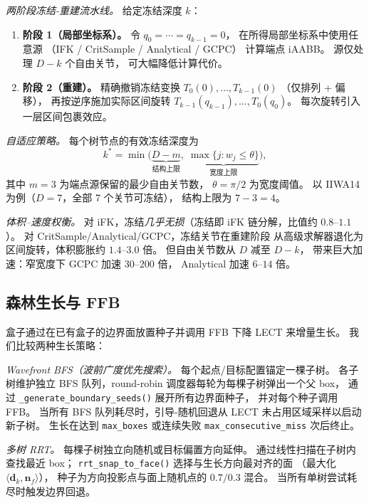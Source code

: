 \documentclass[journal]{IEEEtran}
\begin{document}
\emph{两阶段冻结-重建流水线。}
给定冻结深度 $k$：
\begin{enumerate}
  \item \textbf{阶段 1（局部坐标系）。}
    令 $q_0{=}{\cdots}{=}q_{k-1}{=}0$，
    在所得局部坐标系中使用任意源
    （IFK / CritSample / Analytical / GCPC）
    计算端点 iAABB。
    源仅处理 $D{-}k$ 个自由关节，
    可大幅降低计算代价。
  \item \textbf{阶段 2（重建）。}
    精确撤销冻结变换 $T_0(0),\ldots,T_{k-1}(0)$
    （仅排列 + 偏移），
    再按逆序施加实际区间旋转
    $T_{k-1}(q_{k-1}),\ldots,T_0(q_0)$。
    每次旋转引入一层区间包裹效应。
\end{enumerate}

\emph{自适应策略。}
每个树节点的有效冻结深度为
\begin{equation}\label{eq:freeze_depth}
  k^* = \min\!\bigl(
    \underbrace{D - m}_{\text{结构上限}},\;
    \underbrace{\max\{j : w_j \leq \theta\}}_{\text{宽度上限}}
  \bigr),
\end{equation}
其中 $m{=}3$ 为端点源保留的最少自由关节数，
$\theta{=}\pi/2$ 为宽度阈值。
以 IIWA14 为例（$D{=}7$，全部 7 个关节可冻结），
结构上限为 $7{-}3{=}4$。

\emph{体积--速度权衡。}
对 iFK，冻结\emph{几乎无损}（冻结即 iFK 链分解，比值约 $0.8$--$1.1$）。
对 CritSample/Analytical/GCPC，冻结关节在重建阶段
从高级求解器退化为区间旋转，体积膨胀约 $1.4$--$3.0$ 倍。
但自由关节数从 $D$ 减至 $D{-}k$，
带来巨大加速：窄宽度下 GCPC 加速 $30$--$200$ 倍，
Analytical 加速 $6$--$14$ 倍。

\subsection{森林生长与 FFB}\label{sec:forest_growth}

盒子通过在已有盒子的边界面放置种子并调用 FFB 下降 LECT 来增量生长。
我们比较两种生长策略：

\emph{Wavefront BFS（波前广度优先搜索）。}
每个起点/目标配置锚定一棵子树。
各子树维护独立 BFS 队列，round-robin 调度器每轮为每棵子树弹出一个父 box，
通过 \texttt{\_generate\_boundary\_seeds()} 展开所有边界面种子，
并对每个种子调用 FFB。
当所有 BFS 队列耗尽时，引导-随机回退从 LECT 未占用区域采样以启动新子树。
生长在达到 \texttt{max\_boxes} 或连续失败 \texttt{max\_consecutive\_miss}
次后终止。

\emph{多树 RRT。}
每棵子树独立向随机或目标偏置方向延伸。
通过线性扫描在子树内查找最近 box；
\texttt{rrt\_snap\_to\_face()} 选择与生长方向最对齐的面
（最大化 $\langle \mathbf{d}_k, \mathbf{n}_f \rangle$），
种子为方向投影点与面上随机点的 $0.7/0.3$ 混合。
当所有单树尝试耗尽时触发边界回退。
\end{document}
